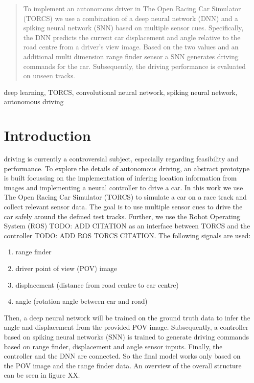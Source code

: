 \documentclass[10pt,a4paper,twoside,journal]{IEEEtran}
\begin{document}
\begin{abstract}
	To implement an autonomous driver in The Open Racing Car Simulator (TORCS)
	we use a combination of a deep neural network (DNN) and a spiking neural network (SNN) based on multiple
	sensor cues. Specifically, the DNN predicts the current car displacement
	and angle relative to the road centre from a driver's view image. Based on the two values
	and an additional multi dimension range finder sensor a SNN generates driving commands for the car. Subsequently, the driving performance is evaluated on unseen tracks.
\end{abstract}

\begin{IEEEkeywords}
	deep learning, TORCS, convolutional neural network, spiking neural network, autonomous driving
\end{IEEEkeywords}

%
%
\section{Introduction}
\label{sc:intro}

 driving is currently a controversial subject, especially 
regarding feasibility and performance. To explore the details of autonomous driving, an abstract prototype is built focussing on the implementation of infering location information from images and implementing a neural controller to drive a car. In this work we use The Open Racing Car Simulator (TORCS) to simulate a car on a race track and collect relevant sensor data. The goal is to use multiple sensor cues to drive the car safely around the defined test tracks. Further, we use the Robot Operating System (ROS) TODO: ADD CITATION as an interface between TORCS and the controller TODO: ADD ROS TORCS CITATION. The following signals are used:
\begin{enumerate}
	\item range finder
	\item driver point of view (POV) image
	\item displacement (distance from road centre to car centre)
	\item angle (rotation angle between car and road)
\end{enumerate}
Then, a deep neural network will be trained on the ground truth data to infer the angle and displacement from the provided POV image. Subsequently, a controller based on spiking neural networks (SNN) is trained to generate driving commands based on range finder, displacement and angle sensor inputs. Finally, the controller and the DNN are connected. So the final model works only based on the POV image and the range finder data. An overview of the overall structure can be seen in figure XX.
\end{document}
